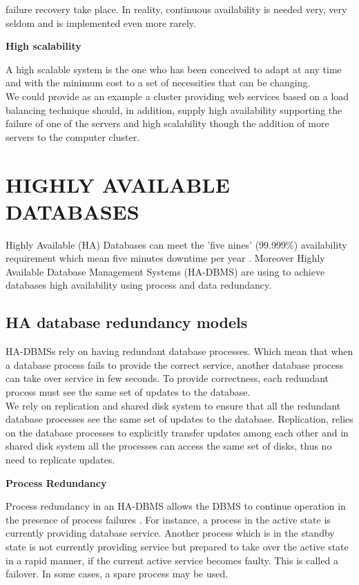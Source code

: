 \documentclass[english]{tktltiki2}
\theoremstyle{definition}
\theoremstyle{remark}
\begin{document}
failure recovery take place. In reality, continuous availability is needed very, very seldom and is implemented even more rarely.
\begin{flushleft}
\textbf{High scalability}
\end{flushleft}
A high scalable system is the one who has been conceived to adapt at any time and with the minimum cost to a set of necessities that can be changing.\\ We could provide as an example a cluster providing web services based on a load balancing technique should, in addition, supply high availability supporting the failure of one of the servers and high scalability though the addition of more servers to the computer cluster.
\pagebreak

\section{HIGHLY AVAILABLE DATABASES}

Highly Available (HA) Databases  can meet the ’five nines’ (99.999\%) availability requirement which mean five minutes downtime per year \cite{AAMES}. Moreover Highly Available Database Management Systems (HA-DBMS) \cite{inproceedings} are using to achieve databases high availability using process and data redundancy. 

\subsection{HA database redundancy models}
HA-DBMSs rely on having redundant database processes. Which mean that when a database process fails to provide the correct service, another database process can take over service in few seconds. To provide correctness, each redundant process must see the same set of updates to the database.\\
We rely on replication and shared disk system to ensure that all the redundant database processes see the same set of updates to the database.
Replication, relies on the database processes to explicitly transfer updates among each other and in shared disk system  \cite{Norman:1996:MAS:234889.234892} all the processes can access the same set of disks, thus no need to replicate updates.
\begin{flushleft}
\textbf{Process Redundancy}
\end{flushleft}
Process redundancy in an HA-DBMS allows the DBMS to continue operation in the presence of process failures \cite{inproceedings}. For instance, a process in the active state is currently providing database service. Another process which is in the standby state is not currently providing service but prepared to take over the active state in a rapid manner, if the current active service becomes faulty. This is called a failover. In some cases, a spare process may be used.
\end{document}
